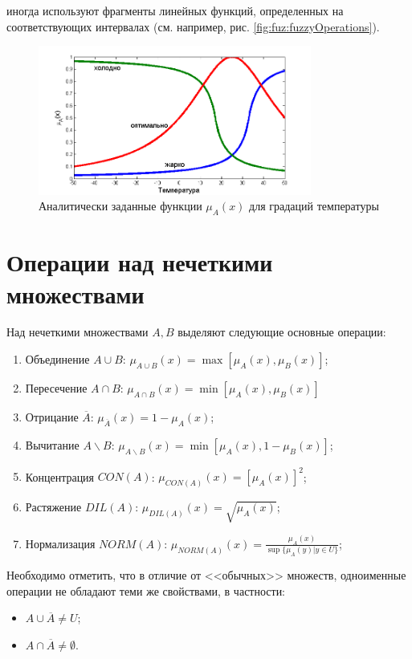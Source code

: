 иногда используют фрагменты линейных функций, определенных на соответствующих интервалах (см. например, рис. \ref{fig:fuz:fuzzyOperations}).

\begin{figure}
    \centering
    \includegraphics[width=0.8\textwidth]{fig/fuzzyTemperature}
    \caption{Аналитически заданные функции $\mu_A(x)$ для градаций температуры}
    \label{fig:fuz:fuzzyTemperature}
\end{figure} 


\section{Операции над нечеткими множествами}

Над нечеткими множествами $A,B$ выделяют следующие основные операции:
\begin{enumerate}
    \item Объединение $A\cup B$: $\mu_{A\cup B}(x)=\max[\mu_A(x),\mu_B(x)]$;
    \item Пересечение $A\cap B$: $\mu_{A\cap B}(x)=\min[\mu_A(x),\mu_B(x)]$
    \item Отрицание $\overline{A}$: $\mu_{\overline{A}}(x)=1-\mu_A(x)$;
    \item Вычитание $A\backslash B$: $\mu_{A\backslash B}(x)=\min[\mu_A(x), 1-\mu_B(x)]$;
    \item Концентрация $CON(A)$: $\mu_{CON(A)}(x)=[\mu_A(x)]^2$;
    \item Растяжение $DIL(A)$: $\mu_{DIL(A)}(x)=\sqrt{\mu_A(x)}$;
    \item Нормализация $NORM(A)$: $\mu_{NORM(A)}(x)=\frac{\mu_A(x)}{\sup\{\mu_A(y)|y\in U\}}$;
\end{enumerate}

Необходимо отметить, что в отличие от <<обычных>> множеств, одноименные операции не обладают теми же свойствами, в частности:
\begin{itemize}
    \item $A\cup\overline{A}\neq U$;
    \item $A\cap\overline{A}\neq\emptyset$.
\end{itemize}

